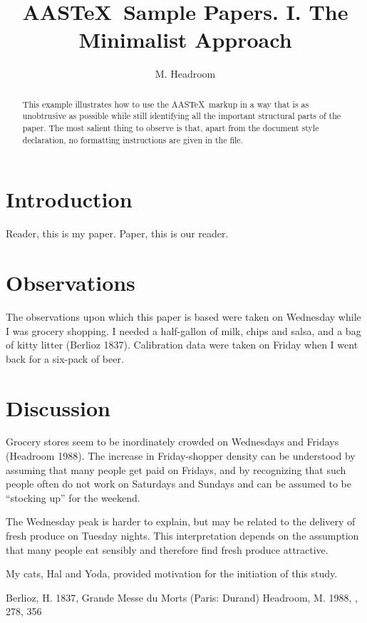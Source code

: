 



\title{AAS\TeX\ Sample Papers. I. The Minimalist Approach}
\author{M. Headroom}

\begin{abstract}
This example illustrates how to use the AAS\TeX\ markup in a
way that is as unobtrusive as possible while still identifying
all the important structural parts of the paper.
The most salient thing to observe is that, apart from the document
style declaration, no formatting instructions are given in the file.
\end{abstract}


\section{Introduction}

Reader, this is my paper.  Paper, this is our reader.

\section{Observations}

The observations upon which this paper is based were taken on Wednesday
while I was grocery shopping.  I needed a half-gallon of milk, chips and
salsa, and a bag of kitty litter  (Berlioz 1837). 
Calibration data were taken on Friday
when I went back for a six-pack of beer.

\section{Discussion}

Grocery stores  seem to be inordinately crowded on Wednesdays and Fridays
 (Headroom 1988).  The increase in Friday-shopper density can
be understood by assuming that many people get paid on Fridays,
and by recognizing that such people often do not work on Saturdays and
Sundays and can be assumed to be ``stocking up'' for the weekend.

The Wednesday peak is harder to explain, but may be related to the
delivery of fresh produce on Tuesday nights.  This interpretation
depends on the assumption that many people 
eat sensibly and therefore find fresh produce attractive.

\acknowledgments

My cats, Hal and Yoda, provided motivation for the initiation of this study.

\begin{references}
 Berlioz, H. 1837, Grande Messe du Morts (Paris: Durand)
 Headroom, M. 1988, \apj, 278, 356
\end{references}


